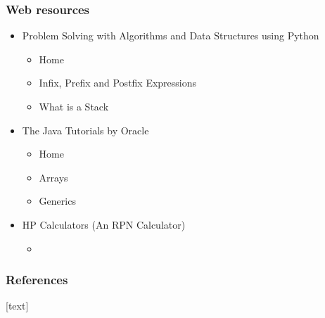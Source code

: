 \documentclass[aspectratio=169,10pt,compress]{beamer}
\begin{document}
\begin{frame}\frametitle{Web resources}
	\begin{itemize}

		\item 
		Problem Solving with Algorithms and Data Structures using Python
		\begin{itemize}
			
			\item 
			Home~\cite{pswads}
		
			\item 
			Infix, Prefix and Postfix Expressions~\cite{pswadsPostfix}
			
			\item
			What is a Stack~\cite{pswadsStack} 
			
		\end{itemize}

		\item 
		The Java Tutorials by Oracle
		\begin{itemize}
			
			\item 
			Home~\cite{TheJavaTutorials}
			
			\item
			Arrays~\cite{TheJavaTutorialsArray}
			
			\item
			Generics~\cite{TheJavaTutorialsGenerics}
			
		\end{itemize}
		
		\item
		HP Calculators (An RPN Calculator)
		\begin{itemize}
			
			\item 
		\end{itemize}
	\end{itemize}
\end{frame}



\begin{frame}[allowframebreaks]\frametitle{References}
	[text] %
%	
%	
%	
	
	\tiny %
	
\end{frame}

\end{document}
